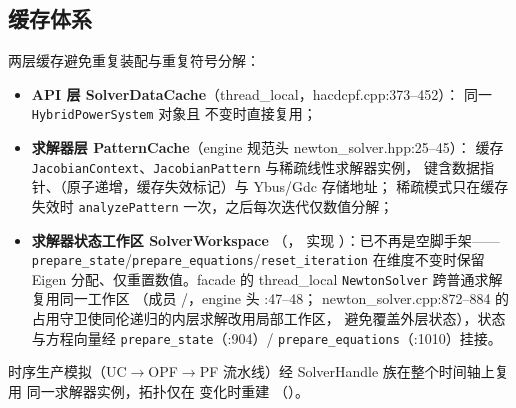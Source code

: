 \subsection{缓存体系}
两层缓存避免重复装配与重复符号分解：
\begin{itemize}
  \item \textbf{API 层 SolverDataCache}（thread\_local，hacdcpf.cpp:373--452）：
        同一 \texttt{HybridPowerSystem} 对象且  不变时直接复用；
  \item \textbf{求解器层 PatternCache}（engine 规范头 newton\_solver.hpp:25--45）：
        缓存 \texttt{JacobianContext}、\texttt{JacobianPattern} 与稀疏线性求解器实例，
        键含数据指针、（原子递增，缓存失效标记）与 Ybus/Gdc 存储地址；
        稀疏模式只在缓存失效时 \texttt{analyzePattern} 一次，之后每次迭代仅数值分解；
  \item \textbf{求解器状态工作区 SolverWorkspace}
        （，
        实现 ）：已不再是空脚手架——
        \texttt{prepare\_state}/\texttt{prepare\_equations}/\texttt{reset\_iteration}
        在维度不变时保留 Eigen 分配、仅重置数值。facade 的 thread\_local
        \texttt{NewtonSolver} 跨普通求解复用同一工作区
        （成员 /，engine 头 :47--48；
        newton\_solver.cpp:872--884 的占用守卫使同伦递归的内层求解改用局部工作区，
        避免覆盖外层状态），状态与方程向量经 \texttt{prepare\_state}（:904）/
        \texttt{prepare\_equations}（:1010）挂接。
\end{itemize}
时序生产模拟（UC$\to$OPF$\to$PF 流水线）经 SolverHandle 族在整个时间轴上复用
同一求解器实例，拓扑仅在  变化时重建
（）。
